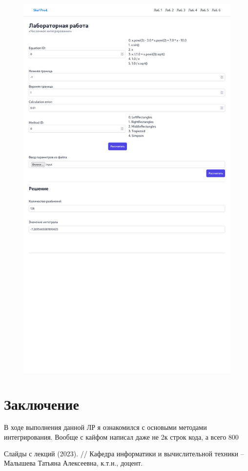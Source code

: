 \documentclass{article}
\begin{document}
            \begin{figure}[H] 
                  \begin{center}  
                         \includegraphics[scale=0.35]{ui2.png}
                        \caption{\small \sl {}}  
                  \end{center}  
            \end{figure}

\section{Заключение}
      В ходе выполнения данной ЛР я ознакомился с основыми методами интегрирования. Вообще с кайфом написал даже не 2к строк кода, а всего 800

\begin{thebibliography}{9}
    Слайды с лекций (2023). // Кафедра информатики и вычислительной техники -- Малышева Татьяна Алексеевна, к.т.н., доцент.
\end{thebibliography} 
\end{document}
